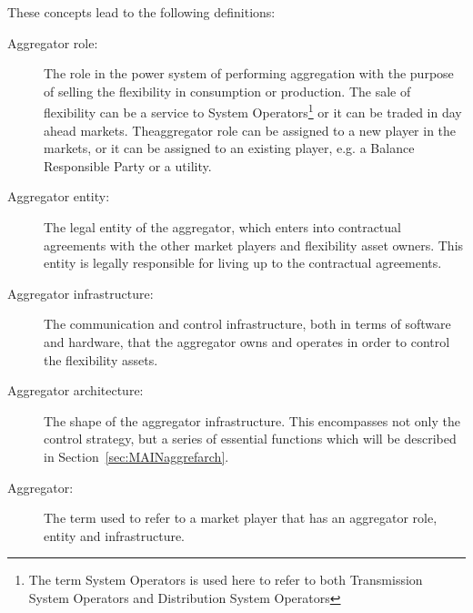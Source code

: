 These concepts lead to the following definitions:
\begin{description}
	\item[Aggregator role:] The role in the power system of performing aggregation with the purpose of selling the flexibility in consumption or production. The sale of flexibility can be a service to System Operators\footnote{The term System Operators is used here to refer to both Transmission System Operators and Distribution System Operators} or it can be traded in day ahead markets. Theaggregator role can be assigned to a new player in the markets, or it can be assigned to an existing player, e.g. a Balance Responsible Party or a utility.
	\item[Aggregator entity:] The legal entity of the aggregator, which enters into contractual agreements with the other market players and flexibility asset owners. This entity is legally responsible for living up to the contractual agreements.
	\item[Aggregator infrastructure:] The communication and control infrastructure, both in terms of software and hardware, that the aggregator owns and operates in order to control the flexibility assets.
	\item[Aggregator architecture:] The shape of the aggregator infrastructure. This encompasses not only the control strategy, but a series of essential functions which will be described in Section~\ref{sec:MAINaggrefarch}.
	\item[Aggregator:] The term used to refer to a market player that has an aggregator role, entity and infrastructure.
\end{description}

